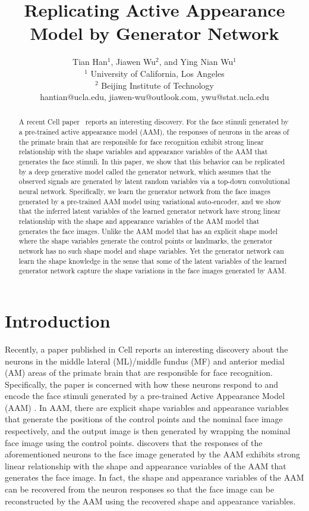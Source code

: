 \documentclass{article}
\title{Replicating Active Appearance Model by Generator Network}
\author{
Tian Han$^1$,
Jiawen Wu$^2$,
and Ying Nian Wu$^1$
\\
$^1$ University of California, Los Angeles \\
$^2$ Beijing Institute of Technology \\
hantian@ucla.edu,
jiawen-wu@outlook.com,
ywu@stat.ucla.edu
}
\begin{document}
\maketitle

\begin{abstract}
A recent Cell paper~\cite{chang2017code} reports an interesting discovery. For the face stimuli generated by a pre-trained active appearance model (AAM), the responses of neurons in the areas of the primate brain that are responsible for face recognition exhibit strong linear relationship with the shape variables and appearance variables of the AAM that generates the face stimuli.
In this paper, we show that this behavior can be replicated by a deep generative model called the generator network, which assumes that the observed signals are generated by  latent random variables  via a top-down convolutional neural network. Specifically, we  learn the generator network from the face images generated by a pre-trained AAM model using variational auto-encoder, and we show that the inferred latent variables of the learned generator network have strong linear relationship with the shape and appearance variables of the AAM model that generates the face images. Unlike the AAM model that has an explicit shape model where the shape variables generate the control points or landmarks, the generator network has no such shape model and shape variables.  Yet the generator network can learn the shape knowledge in the sense that  some of the latent variables of the learned generator network capture the shape variations in the face images generated by AAM.
\end{abstract}

\section{Introduction}


Recently, a paper published in Cell \cite{chang2017code} reports an interesting discovery about the neurons in the middle lateral (ML)/middle fundus (MF) and anterior medial (AM) areas of the primate brain that are responsible for face recognition. Specifically, the paper is concerned with how these neurons respond to and encode the face stimuli generated by a pre-trained  Active Appearance Model (AAM) \cite{cootes2001active,cootes2015active}.  In AAM, there are explicit shape variables and appearance variables  that generate the positions of the control points and the nominal face image respectively, and the output image is then generated by wrapping the nominal face image using the control points.  \cite{chang2017code}  discovers that the responses of the aforementioned neurons  to the face image generated by the AAM exhibits strong linear relationship with the shape and appearance variables  of the AAM that generates the face image. In fact, the shape and appearance variables of the AAM can be recovered from the neuron responses so that the face image can be reconstructed by the AAM using the recovered shape and appearance variables.
\end{document}
